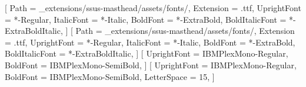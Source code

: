 
\usepackage{fontspec}
\setmainfont{LibreFranklin}[
  Path        = _extensions/ssus-masthead/assets/fonts/,
  Extension   = .ttf,
  UprightFont = *-Regular,
  ItalicFont  = *-Italic,
  BoldFont    = *-ExtraBold,
  BoldItalicFont = *-ExtraBoldItalic,
]
\setsansfont{LibreFranklin}[
  Path        = _extensions/ssus-masthead/assets/fonts/,
  Extension   = .ttf,
  UprightFont = *-Regular,
  ItalicFont  = *-Italic,
  BoldFont    = *-ExtraBold,
  BoldItalicFont = *-ExtraBoldItalic,
]
\setmonofont{IBMPlexMono}[
  UprightFont = IBMPlexMono-Regular,
  BoldFont    = IBMPlexMono-SemiBold,
]
\newfontfamily{}[
  UprightFont = IBMPlexMono-Regular,
  BoldFont    = IBMPlexMono-SemiBold,
  LetterSpace = 15,
]

\usepackage{xcolor}

\AtBeginDocument{%
  \hypersetup{linkcolor=BluePrint, urlcolor=BluePrint, citecolor=BluePrint}%
  \pagecolor{PlanWhite}%
  \color{SurveyInk}%
}

